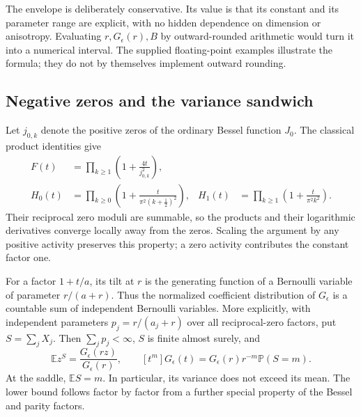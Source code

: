 \documentclass[11pt,letterpaper]{article}
\theoremstyle{remark}\newtheorem{remark}[theorem]{Remark}
\newcommand{\E}{\mathbb E}\newcommand{\Pp}{\mathbb P}
\newcommand{\Prob}{\mathbb P}
\newcommand{\ep}{\epsilon}
\begin{document}
The envelope is deliberately conservative. Its value is that its
constant and its parameter range are explicit, with no hidden
dependence on dimension or anisotropy. Evaluating $r,G_\ep(r),B$ by
outward-rounded arithmetic would turn it into a numerical interval.
The supplied floating-point examples illustrate the formula; they do
not by themselves implement outward rounding.

\subsection{Negative zeros and the variance sandwich}

Let $j_{0,k}$ denote the positive zeros of the ordinary Bessel function
$J_0$. The classical product identities \cite{dlmfzeros,dlmftrig} give
\begin{align}
 F(t)&=\prod_{k\ge1}\left(1+\frac{4t}{j_{0,k}^2}\right),
 \label{lcw:ulb:eq:Fproduct}\\
 H_0(t)&=\prod_{k\ge0}\left(1+
          \frac{t}{\pi^2(k+\tfrac12)^2}\right),
 &H_1(t)&=\prod_{k\ge1}\left(1+\frac{t}{\pi^2k^2}\right).
 \label{lcw:ulb:eq:Hproduct}
\end{align}
Their reciprocal zero moduli are summable, so the products and their
logarithmic derivatives converge locally away from the zeros. Scaling
the argument by any positive activity preserves this property; a zero
activity contributes the constant factor one.

For a factor $1+t/a$, its tilt at $r$ is the generating function
of a Bernoulli variable of parameter $r/(a+r)$. Thus the normalized
coefficient distribution of $G_\ep$ is a countable sum of independent
Bernoulli variables. More explicitly, with independent parameters
$p_j=r/(a_j+r)$ over all reciprocal-zero factors, put $S=\sum_jX_j$.
Then $\sum_jp_j<\infty$, $S$ is finite almost surely, and
\begin{equation}\label{lcw:ulb:eq:tiltedidentity}
 \E z^S=\frac{G_\ep(rz)}{G_\ep(r)},\qquad
 [t^m]G_\ep(t)=G_\ep(r)r^{-m}\Prob(S=m).
\end{equation}
At the saddle, $\E S=m$. In particular, its variance does not exceed its
mean. The lower bound follows factor by factor from a further special
property of the Bessel and parity factors.
\end{document}
